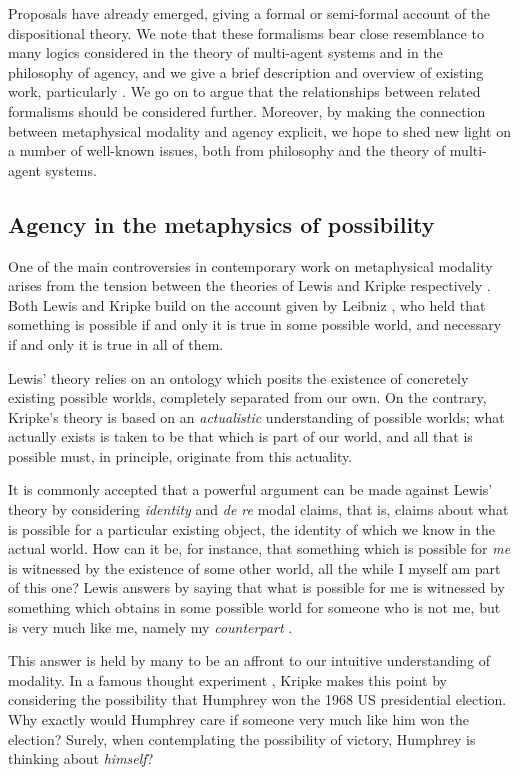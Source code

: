 \documentclass{article}
\begin{document}
Proposals have already emerged, giving a formal or semi-formal account of the dispositional theory. We note that these formalisms bear close resemblance to many logics considered in the theory of multi-agent systems and in the philosophy of agency, and we give a brief description and overview of existing work, particularly \cite{powmod,PhDpos}. We go on to argue that the relationships between related formalisms should be considered further. Moreover, by making the connection between metaphysical modality and agency explicit, we hope to shed new light on a number of well-known issues, both from philosophy and the theory of multi-agent systems.

\subsection*{Agency in the metaphysics of possibility}

One of the main controversies in contemporary work on metaphysical modality arises from the tension between the theories of Lewis and Kripke respectively \cite{KripkeNN,KripkeIN,LewisPW,LewisCPB}. Both Lewis and Kripke build on the account given by Leibniz \cite{Theodicy}, who held that something is possible if and only it is true in some possible world, and necessary if and only it is true in all of them.

Lewis' theory relies on an ontology which posits the existence of concretely existing possible worlds, completely separated from our own. On the contrary, Kripke's theory is based on an \emph{actualistic} understanding of possible worlds; what actually exists is taken to be that which is part of our world, and all that is possible must, in principle, originate from this actuality.

It is commonly accepted that a powerful argument can be made against Lewis' theory by considering \emph{identity} and \emph{de re} modal claims, that is, claims about what is possible for a particular existing object, the identity of which we know in the actual world. How can it be, for instance, that something which is possible for \emph{me} is witnessed by the existence of some other world, all the while I myself am part of this one? Lewis answers by saying that what is possible for me is witnessed by something which obtains in some possible world for someone who is not me, but is very much like me, namely my \emph{counterpart} \cite{LewisCPB}. 

This answer is held by many to be an affront to our intuitive understanding of modality. In a famous thought experiment \cite{KripkeNN}, Kripke makes this point by considering the possibility that Humphrey won the 1968 US presidential election. Why exactly would Humphrey care if someone very much like him won the election? Surely, when contemplating the possibility of victory, Humphrey is thinking about \emph{himself}?
\end{document}
